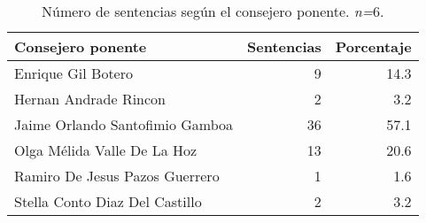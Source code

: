 \begin{table}[H]
\centering
\caption{Número de sentencias según el consejero ponente. \textit{n=}6.} 
\label{tab:consejero}
\begin{tabular}{lrr}
  \hline
Consejero ponente & Sentencias & Porcentaje \\ 
  \hline
Enrique Gil Botero &  9 & 14.3 \\ 
  Hernan Andrade Rincon &  2 & 3.2 \\ 
  Jaime Orlando Santofimio Gamboa & 36 & 57.1 \\ 
  Olga Mélida Valle De La Hoz & 13 & 20.6 \\ 
  Ramiro De Jesus Pazos Guerrero &  1 & 1.6 \\ 
  Stella Conto Diaz Del Castillo &  2 & 3.2 \\ 
   \hline
\end{tabular}
\end{table}

